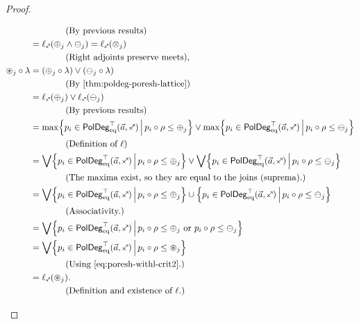 \documentclass[a4paper]{memoir}
\begin{document}
\begin{proof}
\begin{enumerate}
\begin{itemize}
\begin{align*}
				& \qquad \qquad \text{(By previous results)} \\
				&= \ell_\ypolar(\pospol_j \wedge \negpol_j) = \ell_\ypolar(\mixpol_j) \\
				& \qquad \qquad \text{(Right adjoints preserve meets),} \\
				\isopol_j \circ \lambda
				&= (\pospol_j \circ \lambda) \vee (\negpol_j \circ \lambda) \\
				& \qquad \qquad \text{(By \cref{thm:poldeg-poresh-lattice})} \\
				&= \ell_\ypolar(\pospol_j) \vee \ell_\ypolar(\negpol_j) \\
				& \qquad \qquad \text{(By previous results)} \\
				&= \max \set{p_i \in \poldegeqtop(\vec a, \ypolar)}{p_i \circ \rho \leq \pospol_j} \vee \max \set{p_i \in \poldegeqtop(\vec a, \ypolar)}{p_i \circ \rho \leq \negpol_j} \\
				& \qquad \qquad \text{(Definition of $\ell$)} \\
				&= \bigvee \set{p_i \in \poldegeqtop(\vec a, \ypolar)}{p_i \circ \rho \leq \pospol_j} \vee \bigvee \set{p_i \in \poldegeqtop(\vec a, \ypolar)}{p_i \circ \rho \leq \negpol_j} \\
				& \qquad \qquad \text{(The maxima exist, so they are equal to the joins (suprema).)} \\
				&= \bigvee \set{p_i \in \poldegeqtop(\vec a, \ypolar)}{p_i \circ \rho \leq \pospol_j} \cup \set{p_i \in \poldegeqtop(\vec a, \ypolar)}{p_i \circ \rho \leq \negpol_j} \\
				& \qquad \qquad \text{(Associativity.)} \\
				&= \bigvee \set{p_i \in \poldegeqtop(\vec a, \ypolar)}{p_i \circ \rho \leq \pospol_j \text{ or } p_i \circ \rho \leq \negpol_j} \\
				&= \bigvee \set{p_i \in \poldegeqtop(\vec a, \ypolar)}{p_i \circ \rho \leq \isopol_j} \\
				& \qquad \qquad \text{(Using \cref{eq:poresh-withl-crit2}.)} \\
				&= \ell_\ypolar(\isopol_j). \\
				& \qquad \qquad \text{(Definition and existence of $\ell$.)}
			\end{align*}
		\end{itemize}
		

\end{enumerate}
\end{proof}
\end{document}
